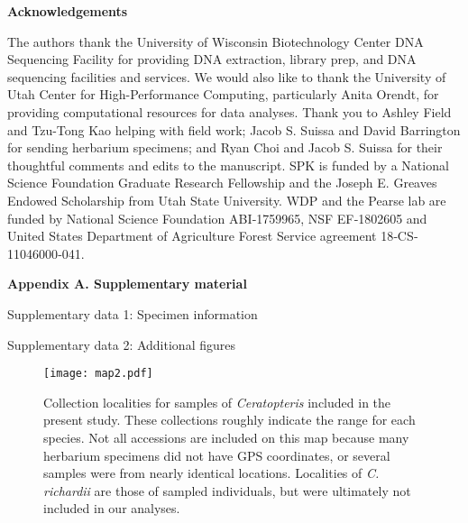 \documentclass[12pt]{article}
\begin{document}
\begin{flushleft}
\vspace{1cm}

{\large\textbf{Acknowledgements}}

The authors thank the University of Wisconsin Biotechnology Center DNA Sequencing Facility for providing DNA extraction, library prep, and DNA sequencing facilities and services. We would also like to thank the University of Utah Center for High-Performance Computing, particularly Anita Orendt, for providing computational resources for data analyses. Thank you to Ashley Field and Tzu-Tong Kao helping with field work; Jacob S. Suissa and David Barrington for sending herbarium specimens; and Ryan Choi and Jacob S. Suissa for their thoughtful comments and edits to the manuscript. SPK is funded by a National Science Foundation Graduate Research Fellowship and the Joseph E. Greaves Endowed Scholarship from Utah State University. WDP and the Pearse lab are funded by National Science Foundation ABI‐1759965, NSF EF‐1802605 and United States Department of Agriculture Forest Service agreement 18‐CS‐11046000‐041.

\vspace{1cm}

{\large\textbf{Appendix A. Supplementary material}}

Supplementary data 1: Specimen information

Supplementary data 2: Additional figures

\end{flushleft}
\vspace{30cm}

\begin{figure}[H]
\centering
\texttt{[image: map2.pdf]}
\caption{Collection localities for samples of \textit{Ceratopteris} included in the present study. These collections roughly indicate the range for each species. Not all accessions are included on this map because many herbarium specimens did not have GPS coordinates, or several samples were from nearly identical locations. Localities of \textit{C. richardii} are those of sampled individuals, but were ultimately not included in our analyses.}
\label{map}
\end{figure}
\end{document}
